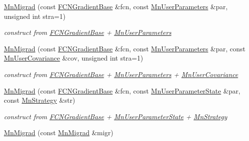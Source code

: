 \begin{DoxyCompactItemize}
\mbox{\hyperlink{classROOT_1_1Minuit2_1_1MnMigrad_ac31c890a07d2e2ca4b52feb5ece6fa3d}{Mn\+Migrad}} (const \mbox{\hyperlink{classROOT_1_1Minuit2_1_1FCNGradientBase}{F\+C\+N\+Gradient\+Base}} \&fcn, const \mbox{\hyperlink{classROOT_1_1Minuit2_1_1MnUserParameters}{Mn\+User\+Parameters}} \&par, unsigned int stra=1)
\begin{DoxyCompactList}\small\item\em construct from \mbox{\hyperlink{classROOT_1_1Minuit2_1_1FCNGradientBase}{F\+C\+N\+Gradient\+Base}} + \mbox{\hyperlink{classROOT_1_1Minuit2_1_1MnUserParameters}{Mn\+User\+Parameters}} \end{DoxyCompactList}\item 
\mbox{\hyperlink{classROOT_1_1Minuit2_1_1MnMigrad_a1c12d5f8210b36cdc555b341f6005c8d}{Mn\+Migrad}} (const \mbox{\hyperlink{classROOT_1_1Minuit2_1_1FCNGradientBase}{F\+C\+N\+Gradient\+Base}} \&fcn, const \mbox{\hyperlink{classROOT_1_1Minuit2_1_1MnUserParameters}{Mn\+User\+Parameters}} \&par, const \mbox{\hyperlink{classROOT_1_1Minuit2_1_1MnUserCovariance}{Mn\+User\+Covariance}} \&cov, unsigned int stra=1)
\begin{DoxyCompactList}\small\item\em construct from \mbox{\hyperlink{classROOT_1_1Minuit2_1_1FCNGradientBase}{F\+C\+N\+Gradient\+Base}} + \mbox{\hyperlink{classROOT_1_1Minuit2_1_1MnUserParameters}{Mn\+User\+Parameters}} + \mbox{\hyperlink{classROOT_1_1Minuit2_1_1MnUserCovariance}{Mn\+User\+Covariance}} \end{DoxyCompactList}\item 
\mbox{\hyperlink{classROOT_1_1Minuit2_1_1MnMigrad_a0397e5984ab0d0163e69315b40a3d520}{Mn\+Migrad}} (const \mbox{\hyperlink{classROOT_1_1Minuit2_1_1FCNGradientBase}{F\+C\+N\+Gradient\+Base}} \&fcn, const \mbox{\hyperlink{classROOT_1_1Minuit2_1_1MnUserParameterState}{Mn\+User\+Parameter\+State}} \&par, const \mbox{\hyperlink{classROOT_1_1Minuit2_1_1MnStrategy}{Mn\+Strategy}} \&str)
\begin{DoxyCompactList}\small\item\em construct from \mbox{\hyperlink{classROOT_1_1Minuit2_1_1FCNGradientBase}{F\+C\+N\+Gradient\+Base}} + \mbox{\hyperlink{classROOT_1_1Minuit2_1_1MnUserParameterState}{Mn\+User\+Parameter\+State}} + \mbox{\hyperlink{classROOT_1_1Minuit2_1_1MnStrategy}{Mn\+Strategy}} \end{DoxyCompactList}\item 
\mbox{\hyperlink{classROOT_1_1Minuit2_1_1MnMigrad_a992fa22c62be692f5cd8f781c73475e0}{Mn\+Migrad}} (const \mbox{\hyperlink{classROOT_1_1Minuit2_1_1MnMigrad}{Mn\+Migrad}} \&migr)

\end{DoxyCompactItemize}
